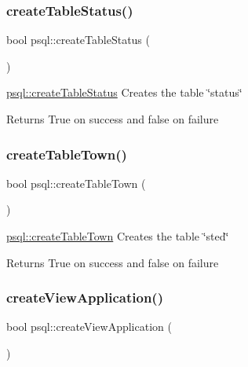 \subsubsection{\texorpdfstring{create\+Table\+Status()}{createTableStatus()}}
{\footnotesize\ttfamily bool psql\+::create\+Table\+Status (\begin{DoxyParamCaption}{ }\end{DoxyParamCaption})}



\mbox{\hyperlink{classpsql_a427ad0f483c8ab7a4d23912278bc69e8}{psql\+::create\+Table\+Status}} Creates the table \char`\"{}status\char`\"{} 

\begin{DoxyReturn}{Returns}
True on success and false on failure 
\end{DoxyReturn}
\mbox{\label{classpsql_a95d1f522766174bd2c6a7b94f725719c}} 
\subsubsection{\texorpdfstring{create\+Table\+Town()}{createTableTown()}}
{\footnotesize\ttfamily bool psql\+::create\+Table\+Town (\begin{DoxyParamCaption}{ }\end{DoxyParamCaption})}



\mbox{\hyperlink{classpsql_a95d1f522766174bd2c6a7b94f725719c}{psql\+::create\+Table\+Town}} Creates the table \char`\"{}sted\char`\"{} 

\begin{DoxyReturn}{Returns}
True on success and false on failure 
\end{DoxyReturn}
\mbox{\label{classpsql_ad6fb8e1e7177c7996f297d477ecceb27}} 
\subsubsection{\texorpdfstring{create\+View\+Application()}{createViewApplication()}}
{\footnotesize\ttfamily bool psql\+::create\+View\+Application (\begin{DoxyParamCaption}{ }\end{DoxyParamCaption})}




